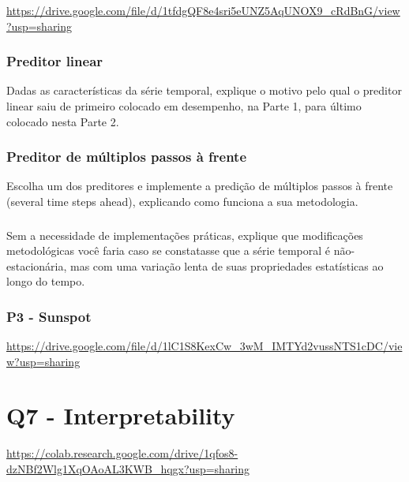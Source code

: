 \documentclass[a4paper]{article}    %
\begin{document}
\href{https://drive.google.com/file/d/1tfdgQF8e4sri5eUNZ5AqUNOX9_cRdBnG/view?usp=sharing}{https://drive.google.com/file/d/1tfdgQF8e4sri5eUNZ5AqUNOX9\_cRdBnG/view?usp=sharing}

\subsubsection{Preditor linear}
Dadas as características da série temporal, explique o motivo pelo qual o preditor linear saiu de primeiro colocado em desempenho, na Parte 1, para último colocado nesta Parte 2. 

\subsubsection{Preditor de múltiplos passos à frente}
Escolha um dos preditores e implemente a predição de múltiplos passos à frente (several time steps ahead), explicando como funciona a sua metodologia. 

\subsubsection{}
Sem a necessidade de implementações práticas, explique que modificações metodológicas você faria caso se constatasse que a série temporal é não-estacionária, mas com uma variação lenta de suas propriedades estatísticas ao longo do tempo.

\subsubsection{P3 - Sunspot}

\href{https://drive.google.com/file/d/1lC1S8KexCw_3wM_IMTYd2vussNTS1cDC/view?usp=sharing}{https://drive.google.com/file/d/1lC1S8KexCw\_3wM\_IMTYd2vussNTS1cDC/view?usp=sharing}

\section{Q7 - Interpretability}

\href{https://colab.research.google.com/drive/1qfos8-dzNBf2Wlg1XqOAoAL3KWB_hqgx?usp=sharing}{https://colab.research.google.com/drive/1qfos8-dzNBf2Wlg1XqOAoAL3KWB\_hqgx?usp=sharing}

\end{document}
